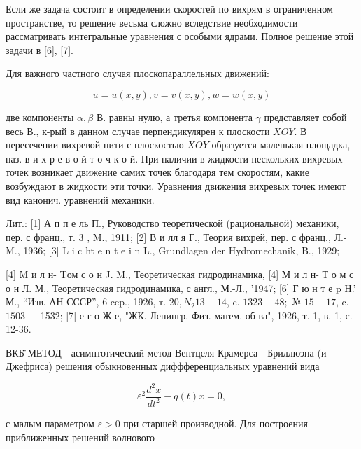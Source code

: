\documentclass[10pt]{article}
\begin{document}
Если же задача состоит в определении скоростей по вихрям в ограниченном пространстве, то решение весьма сложно вследствие необходимости рассматривать интегральные уравнения с особыми ядрами. Полное решение этой задачи в [6], [7].



Для важного частного случая плоскопараллельных движений:



\[

u=u(x, y), v=v(x, y), w=w(x, y)

\]



две компоненты $\alpha, \beta$ В. равны нулю, а третья компонента $\gamma$ представляет собой весь В., к-рый в данном случае перпендикулярен к плоскости $X O Y$. В пересечении вихревой нити с плоскостью $X O Y$ образуется маленькая площадка, наз. в и х р е в о й т о ч к о й. При наличии в жидкости нескольких вихревых точек возникает движение самих точек благодаря тем скоростям, какие возбуждают в жидкости эти точки. Уравнения движения вихревых точек имеют вид канонич. уравнений механики.



Лит.: [1] А п п е ль П., Руководство теоретической (рациональной) механики, пер. с франц., т. 3 , M., 1911; [2] В и лл я Г., Теория вихрей, пер. с франц., Л.-M., 1936; [3] L i c ht e n t e i n L., Grundlagen der Hydromechanik, B., 1929;

[4] M и л н- Tом с о н J. M., Теоретическая гидродинамика, [4] М и л н- Т о м с о н Л. М., Теоретическая гидродинамика, с англ., М.-Л., '1947; [6] Г ю н т е p Н.' М., “Изв. АН СССР”, 6 cep., 1926, т. $20, N_{2} 13-14$, c. $1323-48 ;$ № $15-17$, c. $1503-$ 1532; [7] е г о Ж е, "ЖК. Ленингр. Физ.-матем. об-ва", 1926, т. 1, в. 1, с. 12-36.



ВКБ̈-МЕТОД - асимптотический метод Вентцеля Крамерса - Бриллюэна (и Джефриса) решения обыкновенных диффференциальных уравнений вида



\[

\varepsilon^{2} \frac{d^{2} x}{d t^{2}}-q(t) x=0,

\]



с малым параметром $\varepsilon>0$ при старшей производной. Для построения приближенных решений волнового
\end{document}
